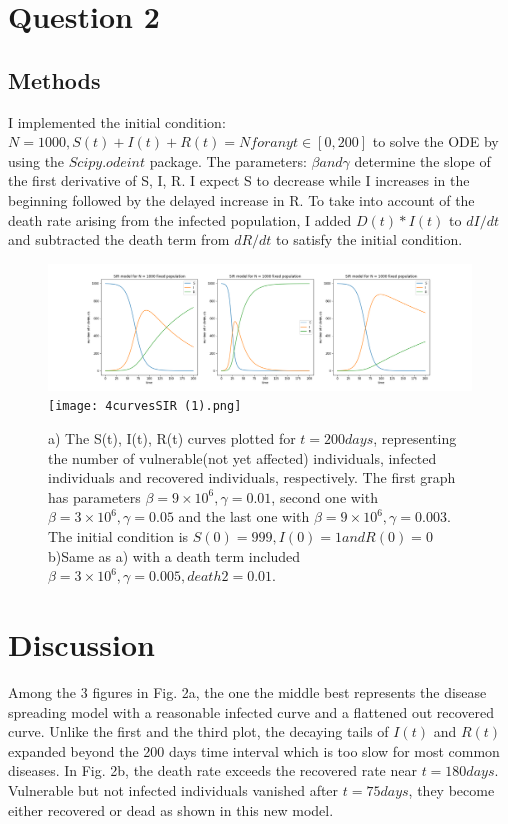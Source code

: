 \documentclass{article}
\begin{document}
\section{Question 2}
\subsection{Methods}
I implemented the initial condition: $N = 1000, S(t) + I(t) + R(t) = N for any t\in[0, 200]$ to solve the ODE by using the $Scipy.odeint$ package. The parameters: $\beta and \gamma$ determine the slope of the first derivative of S, I, R. I expect S to decrease while I increases in the beginning followed by the delayed increase in R. To take into account of the death rate arising from the infected population, I added $D(t)*I(t)$ to $dI/dt$ and subtracted the death term from $dR/dt$ to satisfy the initial condition. 

\begin{figure}[H]
    \centering
    \includegraphics[scale=0.31]{3curvesSIR.png}
    \texttt{[image: 4curvesSIR (1).png]}
    \caption{a) The S(t), I(t), R(t) curves plotted for \(t=200days\), representing the number of vulnerable(not yet affected) individuals, infected individuals and recovered individuals, respectively. The first graph has parameters \(\beta=9\times10^6, \gamma=0.01\), second one with \(\beta=3\times10^6, \gamma=0.05\) and the last one with \(\beta=9\times10^6, \gamma=0.003\). The initial condition is \(S(0)=999, I(0)=1 and R(0)=0\) b)Same as a) with a death term included \(\beta=3\times10^6, \gamma=0.005, death2 = 0.01\). }
    \label{fig:Q2}
\end{figure}

\section{Discussion}
Among the 3 figures in Fig. 2a, the one the middle best represents the disease spreading model with a reasonable infected curve and a flattened out recovered curve. Unlike the first and the third plot, the decaying tails of $I(t)$ and $R(t)$ expanded beyond the 200 days time interval which is too slow for most common diseases. In Fig. 2b, the death rate exceeds the recovered rate near $t = 180days$. Vulnerable but not infected individuals vanished after $t=75days$, they become either recovered or dead as shown in this new model. 
\end{document}

